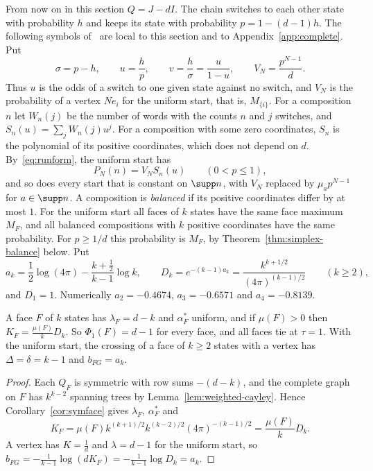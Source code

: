 From now on in this section $Q=J-dI$. The chain switches to each other state with
probability $h$ and keeps its state with probability $p=1-(d-1)h$. The
following symbols of~\cite{paperB} are local to this section and to
Appendix~\ref{app:complete}. Put
\[
\sigma=p-h,\qquad u=\frac hp,\qquad v=\frac h\sigma=\frac u{1-u},\qquad
V_N=\frac{p^{N-1}}d .
\]
Thus $u$ is the odds of a switch to one given state against no switch, and $V_N$ is the
probability of a vertex $Ne_i$ for the uniform start, that is, $M_{\{i\}}$. For a composition
$n$ let $W_n(j)$ be the number of words with the counts $n$ and $j$ switches, and
$S_n(u)=\sum_jW_n(j)u^j$. For a
composition with some zero coordinates, $S_n$ is the polynomial of its positive coordinates,
which does not depend on $d$. By~\eqref{eq:runform}, the uniform start has
\begin{equation}\label{eq:SnVN}
P_N(n)=V_NS_n(u)\qquad(0<p\le1),
\end{equation}
and so does every start that is constant on $\supp n$, with $V_N$ replaced by
$\mu_ap^{N-1}$ for $a\in\supp n$. A composition is \emph{balanced} if its positive coordinates
differ by at most $1$. For the uniform start all faces of $k$ states have the same face maximum
$M_F$, and all balanced compositions with $k$ positive coordinates have the same probability. For
$p\ge1/d$ this probability is $M_F$, by Theorem~\ref{thm:simplex-balance} below. Put
\[
a_k=\frac12\log(4\pi)-\frac{k+\frac12}{k-1}\log k,\qquad
D_k=e^{-(k-1)a_k}=\frac{k^{k+1/2}}{(4\pi)^{(k-1)/2}}\qquad(k\ge2),
\]
and $D_1=1$. Numerically $a_2=-0.4674$, $a_3=-0.6571$ and $a_4=-0.8139$.

\begin{corollary}\label{cor:paperB}
A face $F$ of $k$ states has $\lambda_F=d-k$ and $\alpha^*_F$ uniform, and if $\mu(F)>0$ then
$K_F=\frac{\mu(F)}kD_k$. So $\Phi_1(F)=d-1$ for every face, and all faces tie at $\tau=1$. With
the uniform start, the crossing of a face of $k\ge2$ states with a vertex has
$\Delta=\delta=k-1$ and $b_{FG}=a_k$.
\end{corollary}

\begin{proof}
Each $Q_F$ is symmetric with row sums $-(d-k)$, and the complete graph on $F$ has $k^{k-2}$
spanning trees by Lemma~\ref{lem:weighted-cayley}. Hence Corollary~\ref{cor:symface} gives
$\lambda_F$, $\alpha^*_F$ and
\[
K_F=\mu(F)k^{(k+1)/2}k^{(k-2)/2}(4\pi)^{-(k-1)/2}=\frac{\mu(F)}kD_k.
\]
A vertex has $K=\frac1d$ and $\lambda=d-1$ for the uniform start, so
$b_{FG}=-\frac1{k-1}\log(dK_F)=-\frac1{k-1}\log D_k=a_k$.
\end{proof}

